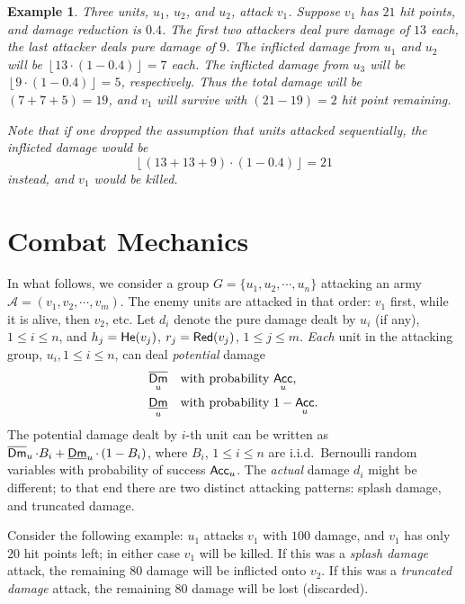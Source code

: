 \documentclass{article}
\newcommand{\floor}[1]{\left\lfloor #1 \right\rfloor}
\renewcommand{\le}{\leqslant}
\renewcommand{\leq}{\leqslant}
\newcommand{\cA}{\mathcal{A}}
\DeclareMathOperator{\He}{{\sf He}} %
\DeclareMathOperator{\DLow}{\underline{\sf Dm}} %
\DeclareMathOperator{\DHigh}{\overline{\sf Dm}} %
\DeclareMathOperator{\Acc}{{\sf Acc}} %
\DeclareMathOperator{\Red}{{\sf Red}} %
\newtheorem{example}{Example}
\numberwithin{equation}{section}
\begin{document}
\begin{example}
    Three units, $u_1$, $u_2$, and $u_2$, attack $v_1$. Suppose $v_1$ has $21$ hit points, and damage reduction is $0.4$.
    The first two attackers deal pure damage of $13$ each, the last attacker deals pure damage of $9$. The inflicted damage from $u_1$ and $u_2$ will be $\floor{13 \cdot (1 - 0.4)} = 7$ each. The inflicted damage from $u_3$ will be $\floor{9 \cdot (1 - 0.4)} = 5$, respectively. Thus the total damage will be $(7 + 7 + 5) = 19$, and $v_1$ will survive with $(21 - 19) = 2$ hit point remaining.

    Note that if one dropped the assumption that units attacked sequentially, the inflicted damage would be
    \[
        \floor{(13 + 13 + 9) \cdot (1 - 0.4)} = 21
    \]
    instead, and $v_1$ would be killed.
\end{example}

\section{Combat Mechanics}

In what follows, we consider a group $G = \{ u_1, u_2, \cdots, u_n \}$ attacking an army $\cA = (v_1, v_2, \cdots , v_m)$. The enemy units are attacked in that order: $v_1$ first, while it is alive, then $v_2$, etc. Let $d_i$ denote the pure damage dealt by $u_i$ (if any), $1 \leq i \leq n$, and $h_j = \He (v_j)$, $r_j = \Red (v_j)$, $1 \leq j \leq m$.
%
\emph{Each} unit in the attacking group, $u_i, 1 \le i \le n$, can deal \emph{potential} damage
\begin{align*}
    \DHigh _u \quad &\text{with probability $\Acc _u$,} \\
    \DLow _u  \quad &\text{with probability $1 - \Acc _u$.}
\end{align*}
The potential damage dealt by $i$-th unit can be written as $\DHigh _u \cdot B_i + \DLow _u \cdot \left( 1 - B_i \right)$, where $B_i$, $1 \le i \le n$ are i.i.d.\ Bernoulli random variables with probability of success $\Acc _u$.
%
The \emph{actual} damage $d_i$ might be different; to that end there are two distinct attacking patterns: splash damage, and truncated damage.

Consider the following example: $u_1$ attacks $v_1$ with $100$ damage, and $v_1$ has only $20$ hit points left; in either case $v_1$ will be killed. If this was a \emph{splash damage} attack, the remaining $80$ damage will be inflicted onto $v_2$. If this was a \emph{truncated damage} attack, the remaining $80$ damage will be lost (discarded).
\end{document}
